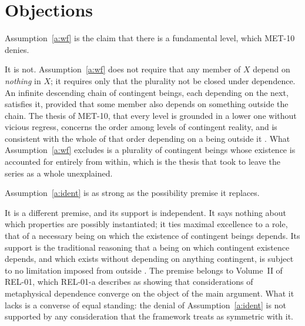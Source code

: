 \documentclass{situationist-preprint}
\begin{document}
\section{Objections}

\begin{objection}
Assumption~\ref{a:wf} is the claim that there is a fundamental level, which MET-10 denies.
\end{objection}

\begin{reply}
It is not. Assumption~\ref{a:wf} does not require that any member of $X$ depend on \emph{nothing} in $X$; it requires only that the plurality not be closed under dependence. An infinite descending chain of contingent beings, each depending on the next, satisfies it, provided that some member also depends on something outside the chain. The thesis of MET-10, that every level is grounded in a lower one without vicious regress, concerns the order among levels of contingent reality, and is consistent with the whole of that order depending on a being outside it \citep{Bliss2013}. What Assumption~\ref{a:wf} excludes is a plurality of contingent beings whose existence is accounted for entirely from within, which is the thesis that \citet[§§36--38]{Leibniz1714} took to leave the series as a whole unexplained.
\end{reply}

\begin{objection}
Assumption~\ref{a:ident} is as strong as the possibility premise it replaces.
\end{objection}

\begin{reply}
It is a different premise, and its support is independent. It says nothing about which properties are possibly instantiated; it ties maximal excellence to a role, that of a necessary being on which the existence of contingent beings depends. Its support is the traditional reasoning that a being on which contingent existence depends, and which exists without depending on anything contingent, is subject to no limitation imposed from outside \citep[ch.~2]{Rowe1975}. The premise belongs to Volume~II of REL-01, which REL-01-a describes as showing that considerations of metaphysical dependence converge on the object of the main argument. What it lacks is a converse of equal standing: the denial of Assumption~\ref{a:ident} is not supported by any consideration that the framework treats as symmetric with it.
\end{reply}
\end{document}
